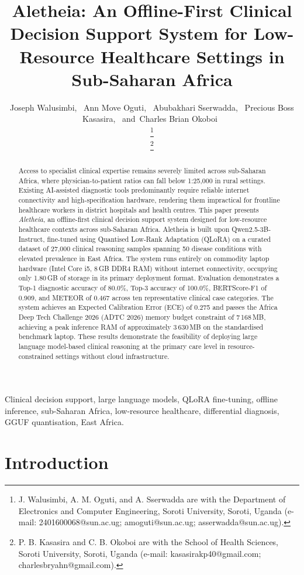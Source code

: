 \documentclass[journal]{IEEEtran}
\title{Aletheia: An Offline-First Clinical Decision Support System
for Low-Resource Healthcare Settings in Sub-Saharan Africa}
\author{Joseph Walusimbi,~\IEEEmembership{}
  Ann Move Oguti,~\IEEEmembership{}
  Abubakhari Sserwadda,~\IEEEmembership{}
  Precious Boss Kasasira,~\IEEEmembership{}
  and~Charles Brian Okoboi~\IEEEmembership{}

\thanks{J. Walusimbi, A. M. Oguti, and A. Sserwadda are with the
Department of Electronics and Computer Engineering, Soroti University,
Soroti, Uganda (e-mail: 2401600068@sun.ac.ug; amoguti@sun.ac.ug;
asserwadda@sun.ac.ug).}

\thanks{P. B. Kasasira and C. B. Okoboi are with the School of Health
Sciences, Soroti University, Soroti, Uganda
(e-mail: kasasirakp40@gmail.com; charlesbryahn@gmail.com).}}
\begin{document}
\maketitle

\begin{abstract}
Access to specialist clinical expertise remains severely limited
across sub-Saharan Africa, where physician-to-patient ratios can
fall below 1:25{,}000 in rural settings. Existing AI-assisted
diagnostic tools predominantly require reliable internet connectivity
and high-specification hardware, rendering them impractical for
frontline healthcare workers in district hospitals and health
centres. This paper presents \textit{Aletheia}, an offline-first
clinical decision support system designed for low-resource
healthcare contexts across sub-Saharan Africa. Aletheia is built
upon Qwen2.5-3B-Instruct, fine-tuned using Quantised Low-Rank
Adaptation (QLoRA) on a curated dataset of 27{,}000 clinical
reasoning samples spanning 50 disease conditions with elevated
prevalence in East Africa. The system runs entirely on commodity
laptop hardware (Intel Core i5, 8\,GB DDR4 RAM) without internet
connectivity, occupying only 1.80\,GB of storage in its primary
deployment format. Evaluation demonstrates a Top-1 diagnostic
accuracy of 80.0\%, Top-3 accuracy of 100.0\%, BERTScore-F1 of
0.909, and METEOR of 0.467 across ten representative clinical case
categories. The system achieves an Expected Calibration Error (ECE)
of 0.275 and passes the Africa Deep Tech Challenge 2026 (ADTC 2026)
memory budget constraint of 7\,168\,MB, achieving
a peak inference RAM of approximately 3\,630\,MB on the standardised
benchmark laptop. These results demonstrate the
feasibility of deploying large language model-based clinical
reasoning at the primary care level in resource-constrained settings
without cloud infrastructure.
\end{abstract}

\begin{IEEEkeywords}
Clinical decision support, large language models, QLoRA fine-tuning,
offline inference, sub-Saharan Africa, low-resource healthcare,
differential diagnosis, GGUF quantisation, East Africa.
\end{IEEEkeywords}

\section{Introduction}
\label{sec:intro}
\end{document}
